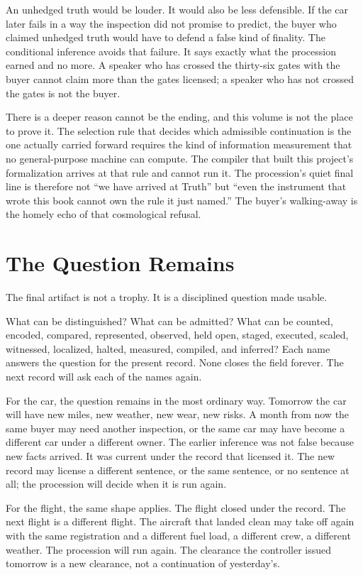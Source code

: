 An unhedged truth would be louder. It would also be less defensible.
If the car later fails in a way the inspection did not promise to
predict, the buyer who claimed unhedged truth would have to defend a
false kind of finality. The conditional inference avoids that failure.
It says exactly what the procession earned and no more. A speaker who
has crossed the thirty-six gates with the buyer cannot claim more than
the gates licensed; a speaker who has not crossed the gates is not the
buyer.

There is a deeper reason  cannot be the ending, and this
volume is not the place to prove it. The selection rule that decides
which admissible continuation is the one actually carried forward
requires the kind of information measurement that no general-purpose
machine can compute. The compiler that built this project's
formalization arrives at that rule and cannot run it. The procession's
quiet final line is therefore not ``we have arrived at Truth'' but
``even the instrument that wrote this book cannot own the rule it just
named.'' The buyer's walking-away is the homely echo of that
cosmological refusal.

\section{The Question Remains}
\label{se:the-question-remains}

The final artifact is not a trophy. It is a disciplined question made
usable.

What can be distinguished? What can be admitted? What can be counted,
encoded, compared, represented, observed, held open, staged, executed,
scaled, witnessed, localized, halted, measured, compiled, and inferred?
Each name answers the question for the present record. None closes the
field forever. The next record will ask each of the names again.

For the car, the question remains in the most ordinary way. Tomorrow
the car will have new miles, new weather, new wear, new risks. A month
from now the same buyer may need another inspection, or the same car
may have become a different car under a different owner. The earlier
inference was not false because new facts arrived. It was current under
the record that licensed it. The new record may license a different
sentence, or the same sentence, or no sentence at all; the procession
will decide when it is run again.

For the flight, the same shape applies. The flight closed under the
record. The next flight is a different flight. The aircraft that
landed clean may take off again with the same registration and a
different fuel load, a different crew, a different weather. The
procession will run again. The clearance the controller issued tomorrow
is a new clearance, not a continuation of yesterday's.

